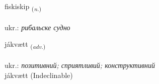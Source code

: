 \documentclass[frontgrid, backgrid]{flacards}\usepackage[]{graphicx}\usepackage[]{xcolor}
\begin{document}
\renewcommand{\flhead}{\vskip5pt \fboxsep=0pt {\small\bfseries\footnotesize Nafnorð | іменник}}
\renewcommand{\fcfoot}{\vskip5pt \fboxsep=0pt \hspace{2pt}{\small\bfseries\footnotesize 3K}}

\renewcommand{\blhead}{\vskip5pt {\small\bfseries\footnotesize Nafnorð | іменник }}
\renewcommand{\bcfoot}{\vskip5pt \hspace{2pt}{\small\bfseries\footnotesize 3K}}


{fiskiskip \small{\textsubscript{(\textit{n.})}} \\[1ex] %
\textphonetic{[fɪscɪscɪp]} \\
ukr.: \emph{рибальске судно} \\  [2ex]
\renewcommand*{\arraystretch}{0.8}
}


\renewcommand{\flhead}{\vskip5pt \fboxsep=0pt {\small\bfseries\footnotesize Atviksorð | прислівник}}
\renewcommand{\fcfoot}{\vskip5pt \fboxsep=0pt \hspace{2pt}{\small\bfseries\footnotesize 3K}}

\renewcommand{\blhead}{\vskip5pt {\small\bfseries\footnotesize Atviksorð | прислівник }}
\renewcommand{\bcfoot}{\vskip5pt \hspace{2pt}{\small\bfseries\footnotesize 3K}}


{jákvætt \small{\textsubscript{(\textit{adv.})}} \\[1ex]
\textphonetic{[jauːkʰvaiht]} \\
ukr.: \emph{позитивний; сприятливий; конструктивний} \\  [2ex]
jákvætt (Indeclinable)}
\end{document}
